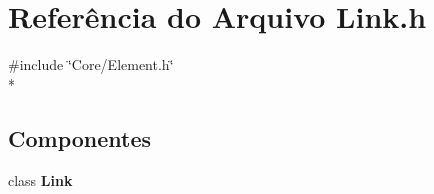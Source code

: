 \section{Referência do Arquivo Link.\+h}
\label{_link_8h}
{\ttfamily \#include \char`\"{}Core/\+Element.\+h\char`\"{}}\\*
\subsection*{Componentes}
\begin{DoxyCompactItemize}
\item 
class {\bf Link}
\end{DoxyCompactItemize}

